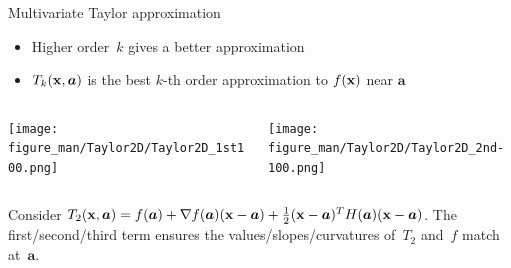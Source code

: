 \documentclass[11pt,compress,t,notes=noshow, xcolor=table]{beamer}
\begin{document}
\begin{vbframe}{Multivariate Taylor approximation}

\begin{itemize}
    \item Higher order~$k$ gives a better approximation
    \item $T_k(\mathbf{x},\bm{a})$ is the best $k$-th order approximation to $f(\mathbf{x})$ near $\bm{a}$
\end{itemize}

\begin{columns}
    \begin{column}{0.48\textwidth}
        \texttt{[image: figure\_man/Taylor2D/Taylor2D\_1st100.png]}
    \end{column}
    \begin{column}{0.48\textwidth}
        \texttt{[image: figure\_man/Taylor2D/Taylor2D\_2nd-100.png]}
    \end{column}
\end{columns}

Consider $T_2(\mathbf{x}, \bm{a}) = f(\bm{a}) + \nabla f(\bm{a}) (\mathbf{x}-\bm{a}) + \frac{1}{2}(\mathbf{x}-\bm{a})^T H (\bm{a})(\mathbf{x}-\bm{a})$.
The first/second/third term ensures the values/slopes/curvatures of~$T_2$ and~$f$ match at~$\bm{a}$.

\end{vbframe}
\end{document}
